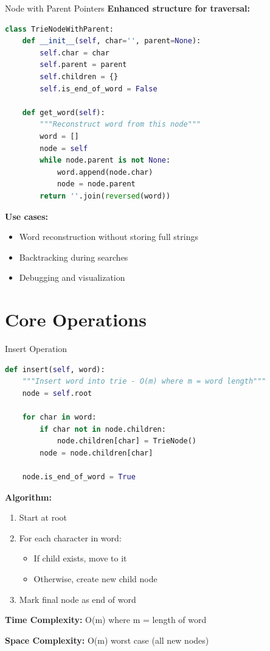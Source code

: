 \documentclass[aspectratio=169]{beamer}
\begin{document}
\begin{frame}[fragile]{Node with Parent Pointers}
  \textbf{Enhanced structure for traversal:}

  \begin{lstlisting}[language=Python, basicstyle=\ttfamily\small]
class TrieNodeWithParent:
    def __init__(self, char='', parent=None):
        self.char = char
        self.parent = parent
        self.children = {}
        self.is_end_of_word = False

    def get_word(self):
        """Reconstruct word from this node"""
        word = []
        node = self
        while node.parent is not None:
            word.append(node.char)
            node = node.parent
        return ''.join(reversed(word))
  \end{lstlisting}

  \vspace{0.3cm}
  \textbf{Use cases:}
  \begin{itemize}
    \item Word reconstruction without storing full strings
    \item Backtracking during searches
    \item Debugging and visualization
  \end{itemize}
\end{frame}

\section{Core Operations}

\begin{frame}[fragile]{Insert Operation}
  \begin{lstlisting}[language=Python, basicstyle=\ttfamily\small]
def insert(self, word):
    """Insert word into trie - O(m) where m = word length"""
    node = self.root

    for char in word:
        if char not in node.children:
            node.children[char] = TrieNode()
        node = node.children[char]

    node.is_end_of_word = True
  \end{lstlisting}

  \vspace{0.3cm}
  \textbf{Algorithm:}
  \begin{enumerate}
    \item Start at root
    \item For each character in word:
      \begin{itemize}
        \item If child exists, move to it
        \item Otherwise, create new child node
      \end{itemize}
    \item Mark final node as end of word
  \end{enumerate}

  \textbf{Time Complexity:} O(m) where m = length of word

  \textbf{Space Complexity:} O(m) worst case (all new nodes)
\end{frame}
\end{document}
